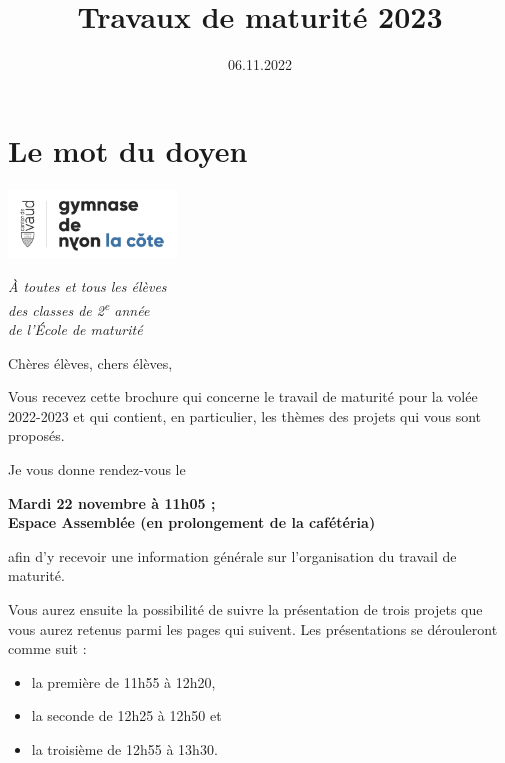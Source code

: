 \documentclass[
  10pt,
  french,
  a5paper,
  openany]{book}
\title{Travaux de maturité 2023}
\author{}
\date{\vspace{-2.5em}06.11.2022}
\providecommand{\tightlist}{%
  \setlength{\itemsep}{0pt}\setlength{\parskip}{0pt}}
\newenvironment{signature}{\begin{flushright}}{\end{flushright}}
\begin{document}
\maketitle

{
\setcounter{tocdepth}{0}
\tableofcontents
}
\hypertarget{le-mot-du-doyen}{%
\chapter*{Le mot du doyen}\label{le-mot-du-doyen}}

\includegraphics[width=\textwidth,height=5em]{images/logoGNLC.png}


\begin{signature}
\emph{À toutes et tous les élèves}\\
\emph{des classes de 2\textsuperscript{e} année}\\
\emph{de l'École de maturité}

\end{signature}


Chères élèves, chers élèves,

Vous recevez cette brochure qui concerne le travail de maturité pour la volée 2022-2023 et qui contient, en particulier, les thèmes des projets qui vous sont proposés.

Je vous donne rendez-vous le

\begin{center}
\textbf{Mardi 22 novembre à 11h05 ;\\
Espace Assemblée (en prolongement de la cafétéria)}

\end{center}

afin d'y recevoir une information générale sur l'organisation du travail de maturité.

Vous aurez ensuite la possibilité de suivre la présentation de trois projets que vous aurez retenus parmi les pages qui suivent. Les présentations se dérouleront comme suit :

\begin{itemize}
\tightlist
\item
  la première de 11h55 à 12h20,
\item
  la seconde de 12h25 à 12h50 et
\item
  la troisième de 12h55 à 13h30.
\end{itemize}
\end{document}
